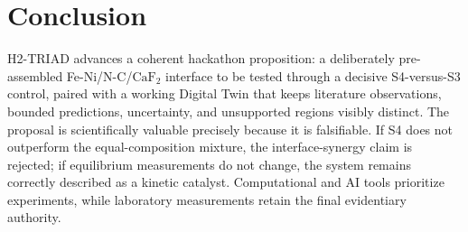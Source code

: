 \documentclass[11pt,a4paper]{article}
\newcommand{\CaFtwo}{\ensuremath{\mathrm{CaF}_{2}}}
\begin{document}
\section{Conclusion}

H2-TRIAD advances a coherent hackathon proposition: a deliberately pre-assembled Fe-Ni/N-C/\CaFtwo{} interface to be tested through a decisive S4-versus-S3 control, paired with a working Digital Twin that keeps literature observations, bounded predictions, uncertainty, and unsupported regions visibly distinct. The proposal is scientifically valuable precisely because it is falsifiable. If S4 does not outperform the equal-composition mixture, the interface-synergy claim is rejected; if equilibrium measurements do not change, the system remains correctly described as a kinetic catalyst. Computational and AI tools prioritize experiments, while laboratory measurements retain the final evidentiary authority.
\end{document}
